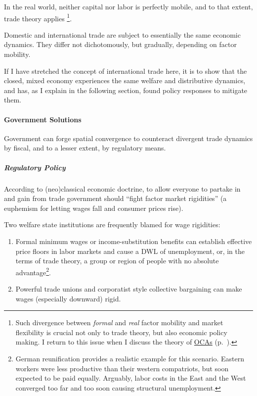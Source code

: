 In the real world, neither capital nor labor is perfectly mobile, and to that extent, trade theory applies \footnote{
	Such divergence between \emph{formal} and \emph{real} factor mobility and market flexibility is crucial not only to trade theory, but also economic policy making. I return to this issue when I discuss the theory of \hyperref[sec:OCA]{\glspl{OCA}} (p.~\pageref{sec:OCA}).}. %

Domestic and international trade are subject to essentially the same economic dynamics. They differ not dichotomously, but gradually, depending on factor mobility. 

If I have stretched the concept of international trade here, it is to show that the closed, mixed economy experiences the same welfare and distributive dynamics, and has, as I explain in the following section, found policy responses to mitigate them.

\paragraph{Government Solutions} Government can forge spatial convergence to counteract divergent trade dynamics by fiscal, and to a lesser extent, by regulatory means.

\subparagraph{Regulatory Policy} According to (neo)classical economic doctrine, to allow everyone to partake in and gain from trade government should ``fight factor market rigidities'' (a euphemism for letting wages fall and consumer prices rise). 

Two welfare state institutions are frequently blamed for wage rigidities:
\begin{enumerate}
	\item Formal minimum wages or income-substitution benefits can establish effective price floors in labor markets and cause a \gls{DWL} of unemployment, or, in the terms of trade theory, a group or region of people with no absolute advantage\footnote{
		German reunification provides a realistic example for this scenario. Eastern workers were less productive than their western compatriots, but soon expected to be paid equally. Arguably, labor costs in the East and the West converged too far and too soon causing structural unemployment.}.%
	\item Powerful trade unions and corporatist style collective bargaining can make wages (especially downward) rigid.
\end{enumerate}

